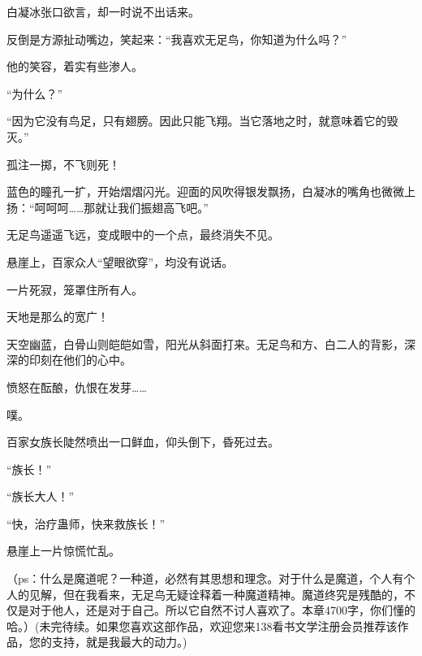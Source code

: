 \begin{this_body}
白凝冰张口欲言，却一时说不出话来。

反倒是方源扯动嘴边，笑起来：“我喜欢无足鸟，你知道为什么吗？”

他的笑容，着实有些渗人。

“为什么？”

“因为它没有鸟足，只有翅膀。因此只能飞翔。当它落地之时，就意味着它的毁灭。”

孤注一掷，不飞则死！

蓝色的瞳孔一扩，开始熠熠闪光。迎面的风吹得银发飘扬，白凝冰的嘴角也微微上扬：“呵呵呵……那就让我们振翅高飞吧。”

无足鸟遥遥飞远，变成眼中的一个点，最终消失不见。

悬崖上，百家众人“望眼欲穿”，均没有说话。

一片死寂，笼罩住所有人。

天地是那么的宽广！

天空幽蓝，白骨山则皑皑如雪，阳光从斜面打来。无足鸟和方、白二人的背影，深深的印刻在他们的心中。

愤怒在酝酿，仇恨在发芽……

噗。

百家女族长陡然喷出一口鲜血，仰头倒下，昏死过去。

“族长！”

“族长大人！”

“快，治疗蛊师，快来救族长！”

悬崖上一片惊慌忙乱。

（ps：什么是魔道呢？一种道，必然有其思想和理念。对于什么是魔道，个人有个人的见解，但在我看来，无足鸟无疑诠释着一种魔道精神。魔道终究是残酷的，不仅是对于他人，还是对于自己。所以它自然不讨人喜欢了。本章4700字，你们懂的哈。）(未完待续。如果您喜欢这部作品，欢迎您来138看书文学注册会员推荐该作品，您的支持，就是我最大的动力。)

\end{this_body}

